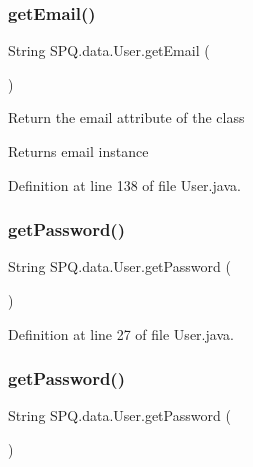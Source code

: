 \subsubsection{\texorpdfstring{get\+Email()}{getEmail()}\hspace{0.1cm}{\footnotesize\ttfamily [4/4]}}
{\footnotesize\ttfamily String S\+P\+Q.\+data.\+User.\+get\+Email (\begin{DoxyParamCaption}{ }\end{DoxyParamCaption})}

Return the email attribute of the class \begin{DoxyReturn}{Returns}
email instance 
\end{DoxyReturn}


Definition at line 138 of file User.\+java.

\mbox{\label{class_s_p_q_1_1data_1_1_user_a688c1eadd21594d52967d87289e23ce2}} 
\subsubsection{\texorpdfstring{get\+Password()}{getPassword()}\hspace{0.1cm}{\footnotesize\ttfamily [1/4]}}
{\footnotesize\ttfamily String S\+P\+Q.\+data.\+User.\+get\+Password (\begin{DoxyParamCaption}{ }\end{DoxyParamCaption})}



Definition at line 27 of file User.\+java.

\mbox{\label{class_s_p_q_1_1data_1_1_user_a688c1eadd21594d52967d87289e23ce2}} 
\subsubsection{\texorpdfstring{get\+Password()}{getPassword()}\hspace{0.1cm}{\footnotesize\ttfamily [2/4]}}
{\footnotesize\ttfamily String S\+P\+Q.\+data.\+User.\+get\+Password (\begin{DoxyParamCaption}{ }\end{DoxyParamCaption})}



